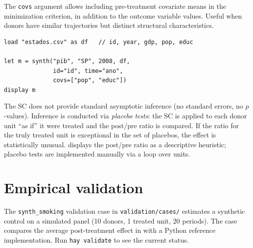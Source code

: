 The \texttt{covs} argument allows including pre-treatment covariate means in
the minimization criterion, in addition to the outcome variable values. Useful
when donors have similar trajectories but distinct structural characteristics.

\begin{lstlisting}[caption={Typical workflow — state policy evaluation}]
load "estados.csv" as df   // id, year, gdp, pop, educ

let m = synth("pib", "SP", 2008, df,
              id="id", time="ano",
              covs=["pop", "educ"])
display m
\end{lstlisting}

\begin{nota}
  The SC does not provide standard asymptotic inference (no standard errors, no
  $p$-values). Inference is conducted via \emph{placebo tests}: the SC is applied
  to each donor unit ``as if'' it were treated and the post/pre ratio is compared.
  If the ratio for the truly treated unit is exceptional in the set of placebos,
  the effect is statistically unusual.
  \hayashi{} displays the post/pre ratio as a descriptive heuristic; placebo tests
  are implemented manually via a loop over units.
\end{nota}

\section{Empirical validation}

The \texttt{synth_smoking} validation case in \texttt{validation/cases/}
estimates a synthetic control on a simulated panel (10 donors, 1 treated unit,
20 periods). The case compares the average post-treatment effect in \hayashi{}
with a Python reference implementation. Run \lstinline{hay validate} to see the
current status.
